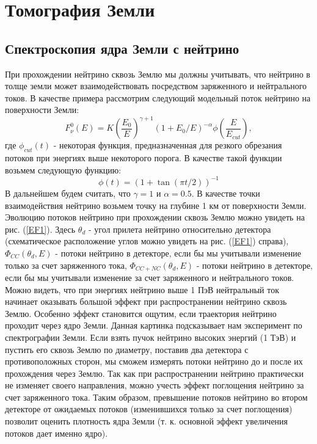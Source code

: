 \section{Томография Земли}
\subsection{Спектроскопия ядра Земли с нейтрино}
При прохождении нейтрино сквозь Землю мы должны учитывать, что нейтрино в толще земли может взаимодействовать посредством заряженного и нейтрального токов. В качестве примера рассмотрим следующий модельный поток нейтрино на поверхности Земли: 
\begin{equation}
    F_{\nu}^{0}(E) = K\left(\frac{E_0}{E}\right)^{\gamma+1} (1+E_0/E)^{-\alpha}\phi\left(\frac{E}{E_{cut}}\right),
\end{equation}
где $\phi_{cut}(t)$ - некоторая функция, предназначенная для резкого обрезания потоков при энергиях выше некоторого порога. В качестве такой функции возьмем следующую функцию:
\begin{equation}
    \phi(t) = (1+\tan(\pi t/2))^{-1}
\end{equation}
В дальнейшем будем считать, что $\gamma = 1$ и $\alpha = 0.5$.
В качестве точки взаимодействия нейтрино возьмем точку на глубине 1 км от поверхности Земли. Эволюцию потоков нейтрино при прохождении сквозь Землю можно увидеть на рис. (\ref{EF1}). Здесь $\theta_d$ - угол прилета нейтрино относительно детектора (схематическое расположение углов можно увидеть на рис. (\ref{EF1}) справа), $\Phi_{CC}(\theta_d, E)$  - потоки нейтрино в детекторе, если бы мы учитывали изменение только за счет заряженного тока, $\Phi_{CC+NC}(\theta_d, E)$  - потоки нейтрино в детекторе, если бы мы учитывали изменение за счет заряженного и нейтрального токов. Можно видеть, что при энергиях нейтрино выше 1 ПэВ нейтральный ток начинает оказывать большой эффект при распространении нейтрино сквозь Землю. Особенно эффект становится ощутим, если траектория нейтрино проходит через ядро Земли. Данная картинка подсказывает нам эксперимент по спектрографии Земли. Если взять пучок нейтрино высоких энергий (1 ТэВ) и пустить его сквозь Землю по диаметру, поставив два детектора с противоположных сторон, мы сможем измерять потоки нейтрино до и после их прохождения через Землю. Так как при распространении нейтрино практически не изменяет своего направления, можно учесть эффект поглощения нейтрино за счет заряженного тока. Таким образом, превышение потоков нейтрино во втором детекторе от ожидаемых потоков (изменившихся только за счет поглощения) позволит оценить плотность ядра Земли (т. к. основной эффект увеличения потоков дает именно ядро).   
